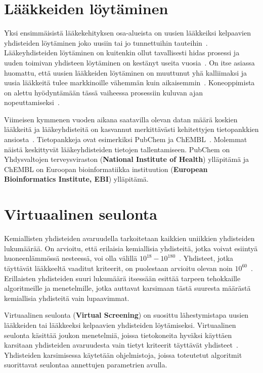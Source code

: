 \documentclass[finnish,twoside,censored,tkt,sw-line]{HYthesisML}
\begin{document}
\section{Lääkkeiden löytäminen}

Yksi ensimmäisistä lääkekehityksen osa-alueista on uusien lääkkeiksi kelpaavien yhdisteiden löytäminen joko uusiin tai jo tunnettuihin tauteihin~\cite{EkinsSean2019Emlf}.
Lääkeyhdisteiden löytäminen on kuitenkin ollut tavallisesti hidas prosessi ja uuden toimivan yhdisteen löytäminen on kestänyt useita vuosia~\cite{EkinsSean2019Emlf,MunosBernardH2011Htrb}.
On itse asiassa huomattu, että uusien lääkkeiden löytäminen on muuttunut yhä kalliimaksi ja uusia lääkkeitä tulee markkinoille vähemmän kuin aikaisemmin~\cite{MunosBernardH2011Htrb}.
Koneoppimista on alettu hyödyntämään tässä vaiheessa prosessiin kuluvan ajan nopeuttamiseksi~\cite{VamathevanJessica2019Aoml}.

Viimeisen kymmenen vuoden aikana saatavilla olevan datan määrä koskien lääkkeitä ja lääkeyhdisteitä on kasvannut merkittävästi kehitettyjen tietopankkien ansiosta~\cite{EkinsSean2019Emlf}.
Tietopankkeja ovat esimerkiksi PubChem ja ChEMBL~\cite{NationalCenterForBiotechnologyInformation,chembl}.
Molemmat näistä keskittyvät lääkeyhdisteiden tietojen tallentamiseen.
PubChem on Yhdysvaltojen terveysviraston (\textbf{National Institute of Health}) ylläpitämä ja ChEMBL on Euroopan bioinformatiikka instituution (\textbf{European Bioinformatics Institute, EBI}) ylläpitämä.

\section{Virtuaalinen seulonta}

Kemiallisten yhdisteiden avaruudella tarkoitetaan kaikkien uniikkien yhdisteiden lukumäärää.
On arvioitu, että erilaisia kemiallisia yhdisteitä, jotka voivat esiintyä huoneenlämmössä nesteessä, voi olla välillä \(10^{18} - 10^{180}\)~\cite{SotrifferChristoph2011VSPC}.
Yhdisteet, jotka täyttävät lääkkeeltä vaaditut kriteerit, on puolestaan arvioitu olevan noin \(10^{60}\)~\cite{SotrifferChristoph2011VSPC}.
Erillaisten yhdisteiden suuri lukumäärä itsessään esittää tarpeen tehokkaille algoritmeille ja menetelmille, jotka auttavat karsimaan tästä suuresta määrästä kemiallisia yhdisteitä vain lupaavimmat.

Virtuaalinen seulonta (\textbf{Virtual Screening}) on suosittu lähestymistapa uusien lääkkeiden tai lääkkeeksi kelpaavien yhdisteiden löytämiseksi.
Virtuaalinen seulonta käsittää joukon menetelmiä, joissa tietokoneita hyväksi käyttäen karsitaan yhdisteiden avaruudesta vain tietyt kriteerit täyttävät yhdisteet~\cite{SotrifferChristoph2011VSPC}.
Yhdisteiden karsimisessa käytetään ohjelmistoja, joissa toteutetut algoritmit suorittavat seulontaa annettujen parametrien avulla.
\end{document}
